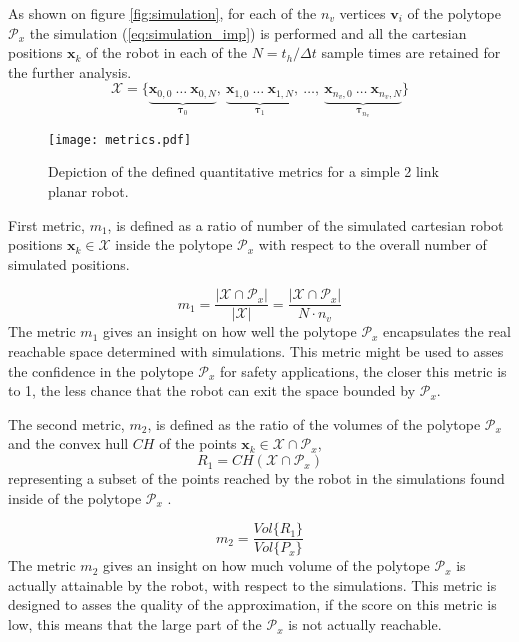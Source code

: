 As shown on figure  \ref{fig:simulation}, for each of the $n_v$ vertices $\bm{v}_i$ of the polytope $\mathcal{P}_x$ the simulation (\ref{eq:simulation_imp}) is performed and all the cartesian positions $\bm{x}_k$ of the robot in each of the $N=t_h/\Delta t$ sample times are retained for the further analysis. $$
\mathcal{X} = \{\underbrace{\bm{x}_{0,0}~\dots ~\bm{x}_{0,N}}_{\bm{\tau}_0},~\underbrace{\bm{x}_{1,0}~\dots~\bm{x}_{1,N}}_{\bm{\tau}_1},~\dots, ~ \underbrace{\bm{x}_{n_v,0}~\dots~\bm{x}_{n_v,N}}_{\bm{\tau}_{n_v}}\}
$$

\begin{figure}[!t]
    \centering
    \texttt{[image: metrics.pdf]}
    \caption{Depiction of the defined quantitative metrics for a simple 2 link planar robot. }
    \label{fig:metrics_defintition}
\vspace{-0.3cm}
\end{figure}


First metric, $m_1$, is defined as a ratio of number of the simulated cartesian robot positions $\bm{x}_k\in \mathcal{X}$ inside the polytope $\mathcal{P}_x$ with respect to the overall number of simulated positions. 

\begin{equation}
    m_1 = \frac{|\mathcal{X}\cap\mathcal{P}_x|}{|\mathcal{X}|} = \frac{|\mathcal{X}\cap\mathcal{P}_x|}{N\cdot n_v}
\end{equation}
The metric $m_1$ gives an insight on how well the polytope $\mathcal{P}_x$ encapsulates the real reachable space determined with simulations. This metric might be used to asses the confidence in the polytope $\mathcal{P}_x$ for safety applications, the closer this metric is to 1, the less chance that the robot can exit the space bounded by $\mathcal{P}_x$.

The second metric, $m_2$, is defined as the ratio of the volumes of the polytope $\mathcal{P}_x$ and the convex hull $CH$ of the points $\bm{x}_k\in\mathcal{X}\cap\mathcal{P}_x$, $$ R_1 = CH(\mathcal{X}\cap\mathcal{P}_x)$$ representing a subset of the points reached by the robot in the simulations found inside of the polytope $\mathcal{P}_x$ .

\begin{equation}
    m_2 = \frac{Vol\{ R_1 \}}{Vol\{P_x\}}
\end{equation}
The metric $m_2$ gives an insight on how much volume of the polytope $\mathcal{P}_x$ is actually attainable by the robot, with respect to the simulations. This metric is designed to asses the quality of the approximation, if the score on this metric is low, this means that the large part of the $\mathcal{P}_x$ is not actually reachable.

